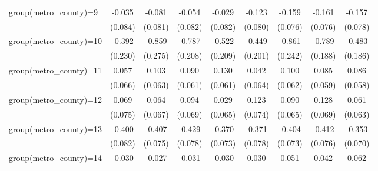 {\begin{tabular}{l*{8}{c}}
group(metro\_county)=9&      -0.035         &      -0.081         &      -0.054         &      -0.029         &      -0.123         &      -0.159\sym{**} &      -0.161\sym{**} &      -0.157\sym{**} \\
                    &     (0.084)         &     (0.081)         &     (0.082)         &     (0.082)         &     (0.080)         &     (0.076)         &     (0.076)         &     (0.078)         \\
group(metro\_county)=10&      -0.392\sym{*}  &      -0.859\sym{***}&      -0.787\sym{***}&      -0.522\sym{**} &      -0.449\sym{**} &      -0.861\sym{***}&      -0.789\sym{***}&      -0.483\sym{**} \\
                    &     (0.230)         &     (0.275)         &     (0.208)         &     (0.209)         &     (0.201)         &     (0.242)         &     (0.188)         &     (0.186)         \\
group(metro\_county)=11&       0.057         &       0.103         &       0.090         &       0.130\sym{**} &       0.042         &       0.100         &       0.085         &       0.086         \\
                    &     (0.066)         &     (0.063)         &     (0.061)         &     (0.061)         &     (0.064)         &     (0.062)         &     (0.059)         &     (0.058)         \\
group(metro\_county)=12&       0.069         &       0.064         &       0.094         &       0.029         &       0.123\sym{*}  &       0.090         &       0.128\sym{*}  &       0.061         \\
                    &     (0.075)         &     (0.067)         &     (0.069)         &     (0.065)         &     (0.074)         &     (0.065)         &     (0.069)         &     (0.063)         \\
group(metro\_county)=13&      -0.400\sym{***}&      -0.407\sym{***}&      -0.429\sym{***}&      -0.370\sym{***}&      -0.371\sym{***}&      -0.404\sym{***}&      -0.412\sym{***}&      -0.353\sym{***}\\
                    &     (0.082)         &     (0.075)         &     (0.078)         &     (0.073)         &     (0.078)         &     (0.073)         &     (0.076)         &     (0.070)         \\
group(metro\_county)=14&      -0.030         &      -0.027         &      -0.031         &      -0.030         &       0.030         &       0.051         &       0.042         &       0.062         \\

\end{tabular}}
